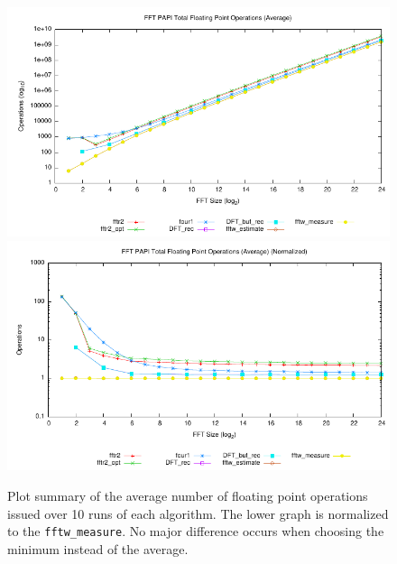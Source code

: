 \documentclass[11 pt]{article}
\begin{document}
\begin{figure}[htbp]
  \centering
	\includegraphics[width=\columnwidth]{../plots/fp_ops_ave}
	\includegraphics[width=\columnwidth]{../plots/fp_ops_ave_norm}
  \caption{Plot summary of the average number of floating point operations
		issued over 10 runs of each algorithm. The lower graph is normalized to the
		\texttt{fftw\_measure}. No major difference occurs when choosing the
		minimum instead of the average.}
  \label{fig:fp_ops}
\end{figure}
\end{document}

